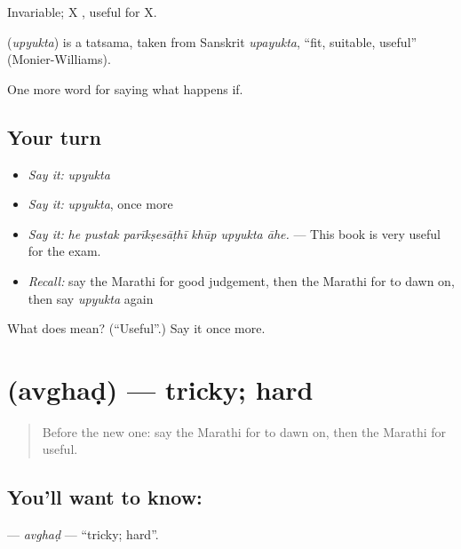 Invariable; X  , useful for X.

\begin{cousinweb}
\textbf{} (\emph{upyukta}) is a tatsama, taken from Sanskrit \emph{upayukta}, \textquotedblleft{}fit, suitable, useful\textquotedblright{} (Monier-Williams).
\end{cousinweb}

\begin{grammarlens}[title={What you've built}]
One more word for saying what happens if.
\end{grammarlens}

\subsection*{Your turn}
\begin{itemize}
\raggedright
  \item \emph{Say it:} \emph{upyukta}
  \item \emph{Say it:} \emph{upyukta}, once more
  \item \emph{Say it:} \emph{he pustak parīkṣesāṭhī khūp upyukta āhe.} — This book is very useful for the exam.
  \item \emph{Recall:} say the Marathi for good judgement, then the Marathi for to dawn on, then say \emph{upyukta} again
\end{itemize}

\begin{tcolorbox}[breakable,colback=teal!4,colframe=teal!35!black,title={Before you move on}]
What does  mean? (\textquotedblleft{}Useful\textquotedblright{}.) Say it once more.
\end{tcolorbox}
\section[\texorpdfstring{\mr{अवघड} (avghaḍ)}{अवघड (avghaḍ)}]{ (avghaḍ) — tricky; hard}

\label{lesson:MR-C395-avghad}



\begin{quote}
Before the new one: say the Marathi for to dawn on, then the Marathi for useful.
\end{quote}

\subsection*{You'll want to know: }
\textbf{} — \emph{avghaḍ} — \textquotedblleft{}tricky; hard\textquotedblright{}.


